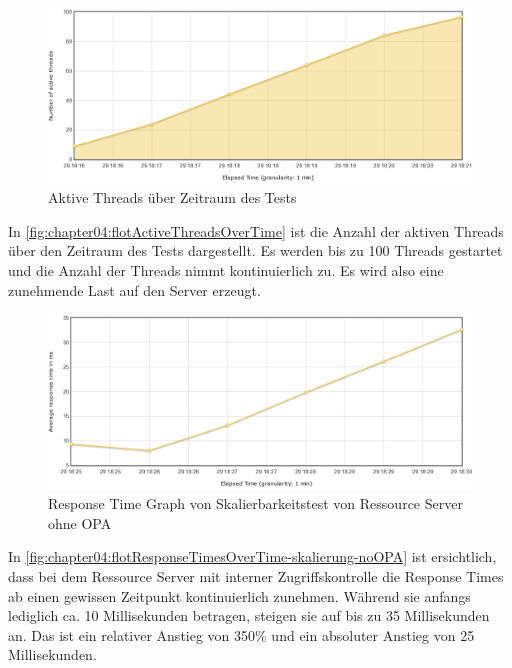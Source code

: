 \begin{figure}[H]
  \centering
  \includegraphics[width=1.0\textwidth]{gfx/flotActiveThreadsOverTime.png}
  \caption{Aktive Threads über Zeitraum des Tests}
  \label{fig:chapter04:flotActiveThreadsOverTime}
\end{figure}

In \autoref{fig:chapter04:flotActiveThreadsOverTime} ist die Anzahl der aktiven Threads über den Zeitraum des Tests dargestellt. Es werden bis zu 100 Threads gestartet und die Anzahl der Threads nimmt kontinuierlich zu. Es wird also eine zunehmende Last auf den Server erzeugt. 

\begin{figure}[H]
  \centering
  \includegraphics[width=1.0\textwidth]{gfx/flotResponseTimesOverTime-skalierung-noOPA.png}
  \caption{Response Time Graph von Skalierbarkeitstest von Ressource Server ohne OPA}
  \label{fig:chapter04:flotResponseTimesOverTime-skalierung-noOPA}
\end{figure}

In \autoref{fig:chapter04:flotResponseTimesOverTime-skalierung-noOPA} ist ersichtlich, dass bei dem Ressource Server mit interner Zugriffskontrolle die Response Times ab einen gewissen Zeitpunkt kontinuierlich zunehmen. Während sie anfangs lediglich ca. 10 Millisekunden betragen, steigen sie auf bis zu 35 Millisekunden an. Das ist ein relativer Anstieg von 350\% und ein absoluter Anstieg von 25 Millisekunden. 

